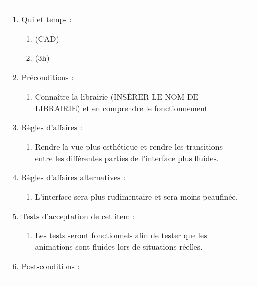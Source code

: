 \begin{longtable}{|l|p{}|}
\begin{enumerate}[label*=\arabic*.]
                \begin{enumerate}[label*=\arabic*.]
                                \item Qui et temps :
                                \begin{enumerate}[label*=\arabic*.]
                                    \item (CAD)
                                    \item (3h)%
                                \end{enumerate}
                                \item Préconditions :
                                \begin{enumerate}[label*=\arabic*.]
                                    \item Connaître la librairie (INSÉRER LE NOM DE LIBRAIRIE) et en comprendre le fonctionnement
                                \end{enumerate}
                                \item Règles d'affaires :
                                \begin{enumerate}[label*=\arabic*.]
                                    \item Rendre la vue plus esthétique et rendre les transitions entre les différentes parties de l'interface plus fluides.
                                \end{enumerate}
                                \item Règles d'affaires alternatives :
                                \begin{enumerate}[label*=\arabic*.]
                                    \item L'interface sera plus rudimentaire et sera moins peaufinée.
                                \end{enumerate}
                                \item Tests d'acceptation de cet item :
                                \begin{enumerate}[label*=\arabic*.]
                                    \item Les tests seront fonctionnels afin de tester que les animations sont fluides lors de situations réelles.
                                \end{enumerate}
                                \item Post-conditions :
                                \begin{enumerate}[label*=\arabic*.]

\end{enumerate}
\end{enumerate}
\end{enumerate}
\end{longtable}

